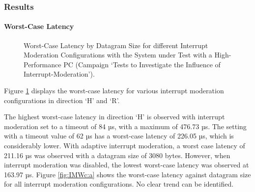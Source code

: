 \subsubsection{Results}
\paragraph{Worst-Case Latency}

\begin{figure}[h!]
  \centering
  \caption{Worst-Case Latency by Datagram Size for different Interrupt Moderation Configurations with the System under Test with a High-Performance PC (Campaign `Tests to Investigate the Influence of Interrupt-Moderation').}
  \label{fig:IMWc}
\end{figure}

Figure \ref{fig:IMWc} displays the worst-case latency for various interrupt moderation configurations in direction `H' and `R'.

The highest worst-case latency in direction `H' is observed with interrupt moderation set to a timeout of 84 µs, with a maximum of 476.73 µs. The setting with a timeout value of 62 µs has a worst-case latency of 226.05 µs, which is considerably lower. With adaptive interrupt moderation, a worst case latency of 211.16 µs was observed with a datagram size of 3080 bytes. However, when interrupt moderation was disabled, the lowest worst-case latency was observed at 163.97 µs. Figure \ref{fig:IMWc:a} shows the worst-case latency against datagram size for all interrupt moderation configurations. No clear trend can be identified.

